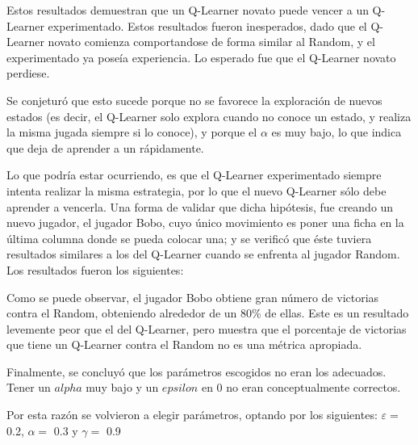 

Estos resultados demuestran que un Q-Learner novato puede vencer a un Q-Learner experimentado. 
Estos resultados fueron inesperados, dado que el Q-Learner novato comienza comportandose de forma similar al Random, y el experimentado ya poseía experiencia. Lo esperado fue que el Q-Learner novato perdiese.

Se conjeturó que esto sucede porque no se favorece la exploración de nuevos estados (es decir, el Q-Learner solo explora cuando no conoce un estado, y realiza la misma jugada siempre si lo conoce), y porque el $\alpha$ es muy bajo, lo que indica que deja de aprender a un rápidamente. 

Lo que podría estar ocurriendo, es que el Q-Learner experimentado siempre intenta realizar la misma estrategia, por lo que el nuevo Q-Learner sólo debe aprender a vencerla.
Una forma de validar que dicha hipótesis, fue creando un nuevo jugador, el jugador Bobo, cuyo único movimiento es poner una ficha en la última columna donde se pueda colocar una; y se verificó que éste tuviera resultados similares a los del Q-Learner cuando se enfrenta al jugador Random.
Los resultados fueron los siguientes:



Como se puede observar, el jugador Bobo obtiene gran número de victorias contra el Random, obteniendo alrededor de un 80\% de ellas. 
Este es un resultado levemente peor que el del Q-Learner, pero muestra que el porcentaje de victorias que tiene un Q-Learner contra el Random no es una métrica apropiada.

Finalmente, se concluyó que los parámetros escogidos no eran los adecuados. Tener un $alpha$ muy bajo y un $epsilon$ en 0 no eran conceptualmente correctos. 

Por esta razón se volvieron a elegir parámetros, optando por los siguientes: $\varepsilon = $ 0.2, $\alpha = $ 0.3 y $\gamma = $ 0.9

